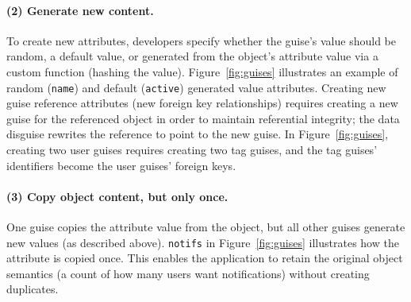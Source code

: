 \paragraph{(2) Generate new content.}
%
To create new attributes, developers specify whether the guise's value should be random,
a default value, or generated from the object's attribute value via a custom function (\eg hashing 
the value).
%
Figure~\ref{fig:guises} illustrates an example of random (\texttt{name}) and default
(\texttt{active}) generated value attributes.
%
%
Creating new guise reference attributes (\eg new foreign key relationships) requires
creating a new guise for the referenced object in order to maintain referential
integrity;
the data disguise rewrites the reference to point to the new guise.
%
In Figure~\ref{fig:guises}, creating two user guises requires creating two
tag guises, and the tag guises' identifiers become the user guises' foreign keys.
%

\paragraph{(3) Copy object content, but only once.}
%
One guise copies the attribute value from the object, but all other guises generate new
values (as described above).
%
\texttt{notifs} in Figure~\ref{fig:guises} illustrates how the attribute is copied once.
%
This enables the application to retain the original object semantics (\eg a count of how many
users want notifications) without creating duplicates.
%


